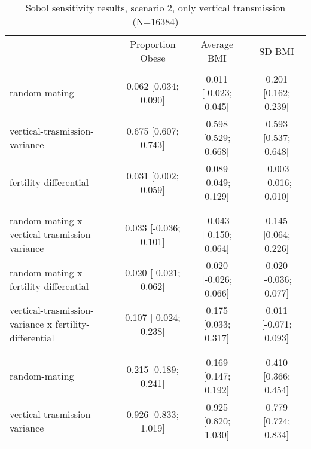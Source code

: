 
    \begin{table}[htp]
    \renewcommand{\arraystretch}{1.3}
    \setlength{\tabcolsep}{3pt}
    \caption{Sobol sensitivity results, scenario 2, only vertical transmission (N=16384)}
    \label{tab:sobol-vt}
    \footnotesize
    \centering
    \begin{threeparttable}
    \begin{tabular}{lccc}
    \hline
    \addlinespace
    & Proportion Obese & Average BMI & SD BMI \\
    \addlinespace
    \hline
    \addlinespace[6pt]
    \multicolumn{4}{l}{\hspace{1em} S1} \\
\hspace{1.5em} random-mating & 0.062 [0.034; 0.090]   & 0.011 [-0.023; 0.045]   & 0.201 [0.162; 0.239] \\
	  \hspace{1.5em} vertical-trasmission-variance & 0.675 [0.607; 0.743]   & 0.598 [0.529; 0.668]   & 0.593 [0.537; 0.648] \\
	  \hspace{1.5em} fertility-differential & 0.031 [0.002; 0.059]   & 0.089 [0.049; 0.129]   & -0.003 [-0.016; 0.010] \\
	 \\
    \addlinespace[12pt]
    \multicolumn{4}{l}{\hspace{1em} S2} \\ 
\hspace{1.5em} random-mating x vertical-trasmission-variance & 0.033 [-0.036; 0.101]   & -0.043 [-0.150; 0.064]   & 0.145 [0.064; 0.226] \\
	  \hspace{1.5em} random-mating x fertility-differential & 0.020 [-0.021; 0.062]   & 0.020 [-0.026; 0.066]   & 0.020 [-0.036; 0.077] \\
	  \hspace{1.5em} vertical-trasmission-variance x fertility-differential & 0.107 [-0.024; 0.238]   & 0.175 [0.033; 0.317]   & 0.011 [-0.071; 0.093] \\
	 \\
    \addlinespace[12pt]
    \multicolumn{4}{l}{\hspace{1em} ST} \\ 
\hspace{1.5em} random-mating & 0.215 [0.189; 0.241]   & 0.169 [0.147; 0.192]   & 0.410 [0.366; 0.454] \\
	  \hspace{1.5em} vertical-trasmission-variance & 0.926 [0.833; 1.019]   & 0.925 [0.820; 1.030]   & 0.779 [0.724; 0.834] \\

\end{tabular}
\end{threeparttable}
\end{table}
